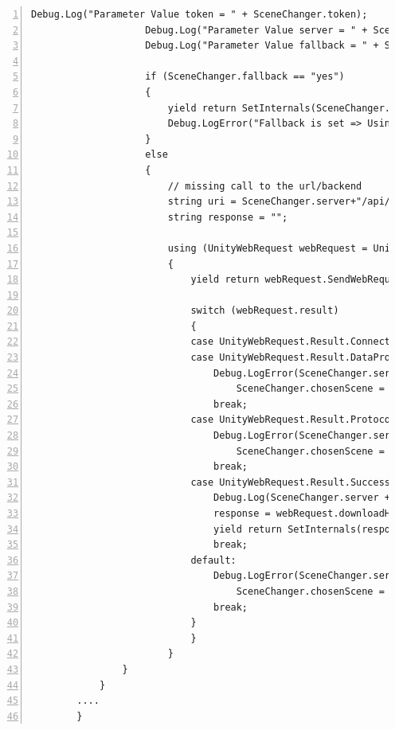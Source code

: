 \begin{lstlisting}[numbers=left,caption={SceneChanger - Start},label={lst:unity-scene-changer-start}]
                    Debug.Log("Parameter Value token = " + SceneChanger.token);
                    Debug.Log("Parameter Value server = " + SceneChanger.server);
                    Debug.Log("Parameter Value fallback = " + SceneChanger.fallback);
                    
                    if (SceneChanger.fallback == "yes")
                    {
                        yield return SetInternals(SceneChanger.fallbackResponse);
                        Debug.LogError("Fallback is set => Using simulation init parameters to start with!");
                    }
                    else
                    {
                        // missing call to the url/backend
                        string uri = SceneChanger.server+"/api/Memoryland?token=" + SceneChanger.token;
                        string response = "";
                        
                        using (UnityWebRequest webRequest = UnityWebRequest.Get(uri))
                        {
                            yield return webRequest.SendWebRequest();
                        
                            switch (webRequest.result)
                            {
                            case UnityWebRequest.Result.ConnectionError:
                            case UnityWebRequest.Result.DataProcessingError:
                                Debug.LogError(SceneChanger.server + ": Error: " + webRequest.error);
                                    SceneChanger.chosenScene = "ERROR";
                                break;
                            case UnityWebRequest.Result.ProtocolError:
                                Debug.LogError(SceneChanger.server + ": HTTP Error: " + webRequest.error);
                                    SceneChanger.chosenScene = "ERROR";
                                break;
                            case UnityWebRequest.Result.Success:
                                Debug.Log(SceneChanger.server + ": Received: " + webRequest.downloadHandler.text);
                                response = webRequest.downloadHandler.text;
                                yield return SetInternals(response);
                                break;
                            default:
                                Debug.LogError(SceneChanger.server + ": unknown " + webRequest.result.ToString());
                                    SceneChanger.chosenScene = "ERROR";
                                break;
                            }
                            }
                        }
                }		
            }
        ....
        }
\end{lstlisting}
    

